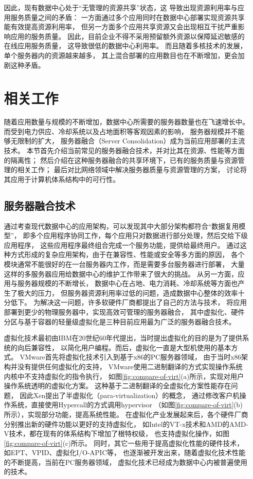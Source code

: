 因此，现有数据中心处于``无管理的资源共享''状态，这
导致出现资源利用率与应用服务质量之间的矛盾：
一方面通过多个应用同时在数据中心部署实现资源共享能有效提高资源利用率，
但另一方面多个应用共享资源又会出现相互干扰严重影响应用的服务质量。
因此，目前企业不得不采用预留额外资源以保障延迟敏感的在线应用服务质量，
这导致很低的数据中心利用率。
而且随着多核技术的发展，单个服务器内的资源越来越多，
其上混合部署的应用数目也在不断增加，更会加剧这种矛盾。

\section{相关工作}

随着应用数量与规模的不断增加，数据中心所需要的服务器数量也在飞速增长中。
而受到电力供应、冷却系统以及占地面积等客观因素的影响，
服务器规模并不能够无限制的扩大，
服务器融合（Server Consolidation）成为当前应用部署的主流技术。
本节首先介绍当前常见的服务器融合技术，并对比其在资源、性能等方面的隔离性；
然后介绍在这种服务器融合的共享环境下，已有的服务质量与资源管理的相关工作；
最后对比网络领域中解决服务器质量与资源管理的方案，
讨论将其应用于计算机体系结构中的可行性。

\subsection{服务器融合技术}

通过考查现代数据中心的应用架构，可以发现其中大部分架构都符合``数据复用模型''，
即多个应用程序协同工作，每个应用只对数据进行部分处理，然后交给下级应用程序，
这些应用程序最终组合完成一个服务功能，提供给最终用户。
通过这种方式形成的复杂应用架构，由于在兼容性、性能或安全等多方面的原因，
各个模块通常不能很好的在一台服务器内工作，而是需要多台服务器进行部署，
大量这样的多服务器应用给数据中心的维护工作带来了很大的挑战。
从另一方面，应用与服务器规模的不断增长，
数据中心在占地、电力消耗、冷却系统等方面也产生了极大的压力，
但服务器资源利用率过低的问题，造成数据中心整体的效率十分低下。
为解决这一问题，许多软硬件厂商都提出了自己的方法与技术，
将应用部署到更少的物理服务器中，实现高效可管理的服务器融合，
其中虚拟化、硬件分区与基于容器的轻量级虚拟化是三种目前应用最为广泛的服务器融合技术。

虚拟化技术最初由IBM在20世纪60年代提出，当时提出虚拟化的目的是为了提供系统的向后兼容性，
以简化用户编程。而后，虚拟化一直是大型机使用的基本方式。
VMware首先将虚拟化技术引入到基于x86的PC服务器领域，
由于当时x86架构并没有提供任何虚拟化的支持，
VMware使用二进制翻译\cite{}的方式实现操作系统内核中不支持虚拟化的指令执行，
如图\ref{fig:compare-of-virt}(a)所示，实现对用户操作系统透明的虚拟化方案。
这种基于二进制翻译的全虚拟化方案性能存在问题，
因此Xen提出了半虚拟化（para-virtualization）\cite{barham_xen_2003}的概念，
通过修改客户机操作系统，直接使用Hypercall的方式调用hypervisor
（如图\ref{fig:compare-of-virt}(b)所示），实现部分功能，提高系统性能。
在虚拟化产业发展起来后，各个硬件厂商分别推出新的硬件功能以更好的支持虚拟化，
如Intel的VT-x技术和AMD的AMD-V技术，都在现有的体系结构下增加了根特权级，
也支持虚拟化操作，如图\ref{fig:compare-of-virt}(c)所示。
同时，其它一些用于提高虚拟化性能的硬件技术，如EPT、VPID、虚拟化I/O-APIC等，
也逐渐被开发出来，随着虚拟化技术性能的不断提高，当前在PC服务器领域，
虚拟化技术已经成为数据中心内被普遍使用的技术。


